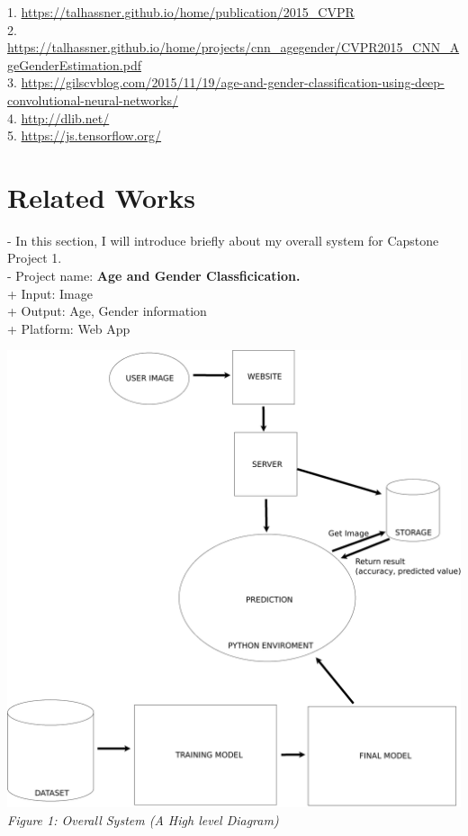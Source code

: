 

1. \url{https://talhassner.github.io/home/publication/2015_CVPR} \\
2. \url{https://talhassner.github.io/home/projects/cnn_agegender/CVPR2015_CNN_AgeGenderEstimation.pdf} \\
3. \url{https://gilscvblog.com/2015/11/19/age-and-gender-classification-using-deep-convolutional-neural-networks/} \\
4. \url{http://dlib.net/} \\
5. \url{https://js.tensorflow.org/} \\
\newpage

\section{Related Works}

- In this section,  I will introduce briefly about my overall system for Capstone Project 1.\\
- Project name: \textbf{Age and Gender Classficication.}\\
\indent + Input: Image\\
\indent + Output: Age, Gender information\\
\indent + Platform: Web App

\begin{center}
\includegraphics[scale=0.12]{overview} \\
\textit{Figure 1: Overall System (A High level Diagram)}
\end{center}


